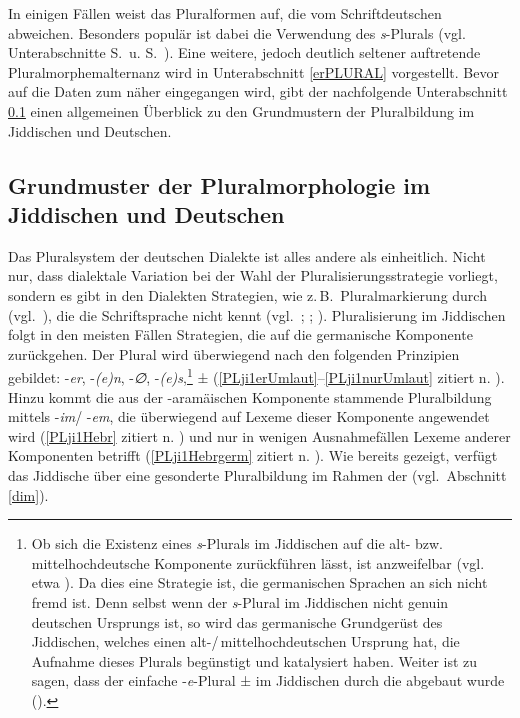 \largerpage[-1]
In einigen Fällen weist das \hai{{\LiJi}} Pluralformen auf, die vom Schriftdeutschen abweichen. Besonders populär ist dabei die Verwendung des  \textit{s}-Plurals (vgl.\, Unterabschnitte S.\, \pageref{sPlural} u. S.\, \pageref{sPluralLiJi}). Eine weitere, jedoch deutlich seltener auftretende Pluralmorphemalternanz wird in Unterabschnitt \ref{erPLURAL} vorgestellt. Bevor auf die Daten zum \hai{{\LiJi}} näher eingegangen wird, gibt der nachfolgende Unterabschnitt \ref{plDEUJI} einen allgemeinen Überblick zu den Grundmustern der Pluralbildung im Jiddischen und Deutschen.


 
\subsection{Grundmuster der Pluralmorphologie im Jiddischen und Deutschen}\label{plDEUJI}
 Das Pluralsystem
der deutschen Dialekte ist alles andere als einheitlich. Nicht nur, dass dialektale Variation bei der Wahl der Pluralisierungsstrategie vorliegt, sondern es gibt  in den Dialekten  Strategien, wie z.\,B.\, Pluralmarkierung durch  (vgl.\, \citealt{GolstonWiese1996,HolsingerHouseman1999,Knaus2003,BirkenesDiss}), die die Schriftsprache nicht kennt (vgl.\, \citealt[414–443]{Schirmunski1962}; \citealt{Nuebling2005}; \citealt[insbes. 155–169]{Wiese2009}). Pluralisierung im Jiddischen folgt in den meisten Fällen Strategien, die auf die germanische Komponente zurückgehen. Der Plural wird überwiegend nach den folgenden Prinzipien gebildet: -\textit{er}, -\textit{(e)n}, -\textit{∅},  -\textit{(e)s},\footnote{Ob sich die Existenz eines \textit{s}-Plurals im Jiddischen auf die alt- bzw. mittelhochdeutsche Komponente zurückführen lässt, ist anzweifelbar (vgl.\, etwa \citealt{King1990,Timm2007}). Da dies eine Strategie ist, die germanischen Sprachen an sich nicht fremd ist. Denn selbst wenn der \textit{s}-Plural im Jiddischen nicht genuin deutschen Ursprungs ist, so wird das germanische Grundgerüst des Jiddischen, welches einen alt-/\,mittelhochdeutschen Ur\-sprung hat, die Aufnahme dieses Plurals begünstigt und katalysiert haben. Weiter ist zu sagen, dass der einfache -\textit{e}-Plural ±  im Jiddischen durch die  abgebaut wurde (\citealt[29]{Timm2007}).\label{FNsplural}} ±  (\ref{PLji1erUmlaut}–\ref{PLji1nurUmlaut} zitiert n. \citealt[163]{Jacobs2005}). Hinzu kommt die aus der -aramäischen Komponente stammende Pluralbildung mittels  -\textit{im}/ -\textit{em}, die überwiegend auf Lexeme dieser Komponente angewendet wird (\ref{PLji1Hebr} zitiert n. \citealt[165]{Jacobs2005}) und nur in wenigen Ausnahmefällen Lexeme anderer Komponenten betrifft (\ref{PLji1Hebrgerm} zitiert n. \citealt[165]{Jacobs2005}). 
 Wie bereits gezeigt, verfügt das Jiddische über eine gesonderte Pluralbildung im Rahmen der  (vgl.\, Abschnitt \ref{dim}).

